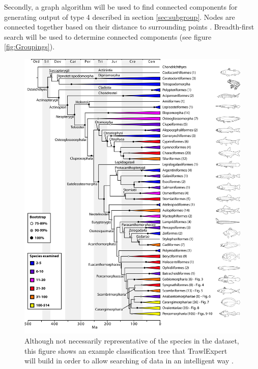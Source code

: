 \documentclass{article}
\begin{document}
Secondly, a graph algorithm will be used to find connected components for generating output of type 4 described in section \ref{sec:subgroup}. Nodes are connected together based on their distance to surrounding points \citep{tom10}. Breadth-first search will be used to determine connected components \citep{broder2000graph} (see figure \ref{fig:Groupings}).

\iffalse %
\begin{figure}[p]
\centering
\includegraphics[width=16cm]{TreeFig.jpg}

\caption{Although not necessarily representative of the species in the dataset, this figure shows an example classification tree that TrawlExpert will build in order to allow searching of data in an intelligent way \citep{plosblog2014}.}
\label{fig:Tree}
\end{figure}
\end{document}
